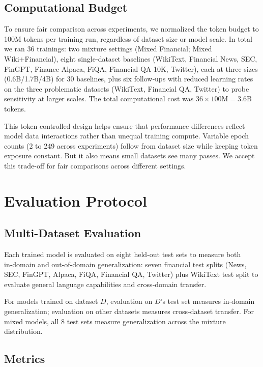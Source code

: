 \subsection{Computational Budget}

To ensure fair comparison across experiments, we normalized the token budget to 100M tokens per training run, regardless of dataset size or model scale. In total we ran 36 trainings: two mixture settings (Mixed Financial; Mixed Wiki+Financial), eight single‑dataset baselines (WikiText, Financial News, SEC, FinGPT, Finance Alpaca, FiQA, Financial QA 10K, Twitter), each at three sizes (0.6B/1.7B/4B) for 30 baselines, plus six follow‑ups with reduced learning rates on the three problematic datasets (WikiText, Financial QA, Twitter) to probe sensitivity at larger scales. The total computational cost was $36\times100\text{M}=3.6\text{B}$ tokens.

This token controlled design helps ensure that performance differences reflect model data interactions rather than unequal training compute. Variable epoch counts (2 to 249 across experiments) follow from dataset size while keeping token exposure constant. But it also means small datasets see many passes. We accept this trade-off for fair comparisons across different settings.

\section{Evaluation Protocol}

\subsection{Multi-Dataset Evaluation}

Each trained model is evaluated on eight held‑out test sets to measure both in‑domain and out‑of‑domain generalization: seven financial test splits (News, SEC, FinGPT, Alpaca, FiQA, Financial QA, Twitter) plus WikiText test split to evaluate general language capabilities and cross‑domain transfer.

For models trained on dataset $D$, evaluation on $D$'s test set measures in-domain generalization; evaluation on other datasets measures cross-dataset transfer. For mixed models, all 8 test sets measure generalization across the mixture distribution.

\subsection{Metrics}

